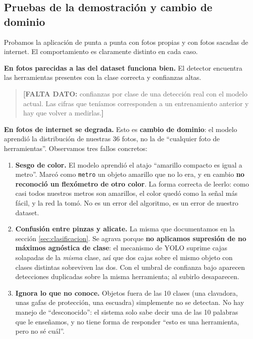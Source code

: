 \documentclass[11pt,a4paper]{article}
\newcommand{\clase}[1]{\texttt{#1}}
\begin{document}
\subsection{Pruebas de la demostración y cambio de dominio}

Probamos la aplicación de punta a punta con fotos propias y con fotos sacadas de internet. El
comportamiento es claramente distinto en cada caso.

\textbf{En fotos parecidas a las del dataset funciona bien.} El detector encuentra las herramientas
presentes con la clase correcta y confianzas altas.

\begin{quote}
\small
\textbf{[FALTA DATO:} confianzas por clase de una detección real con el modelo actual. Las cifras
que teníamos corresponden a un entrenamiento anterior y hay que volver a medirlas.\textbf{]}
\end{quote}

\textbf{En fotos de internet se degrada.} Esto es \textbf{cambio de dominio}: el modelo aprendió la
distribución de nuestras 36 fotos, no la de \enquote{cualquier foto de herramientas}. Observamos
tres fallos concretos:

\begin{enumerate}
  \item \textbf{Sesgo de color.} El modelo aprendió el atajo \enquote{amarillo compacto es igual a
        metro}. Marcó como \clase{metro} un objeto amarillo que no lo era, y en cambio \textbf{no
        reconoció un flexómetro de otro color}. La forma correcta de leerlo: como casi todos
        nuestros metros son amarillos, el color quedó como la señal más fácil, y la red la tomó. No
        es un error del algoritmo, es un error de nuestro dataset.
  \item \textbf{Confusión entre pinzas y alicate.} La misma que documentamos en la sección
        \ref{sec:clasificacion}. Se agrava porque \textbf{no aplicamos supresión de no máximos
        agnóstica de clase}: el mecanismo de YOLO suprime cajas solapadas de la \emph{misma} clase,
        así que dos cajas sobre el mismo objeto con clases distintas sobreviven las dos. Con el
        umbral de confianza bajo aparecen detecciones duplicadas sobre la misma herramienta; al
        subirlo desaparecen.
  \item \textbf{Ignora lo que no conoce.} Objetos fuera de las 10 clases (una clavadora, unas gafas
        de protección, una escuadra) simplemente no se detectan. No hay manejo de
        \enquote{desconocido}: el sistema solo sabe decir una de las 10 palabras que le enseñamos,
        y no tiene forma de responder \enquote{esto es una herramienta, pero no sé cuál}.
\end{enumerate}
\end{document}

